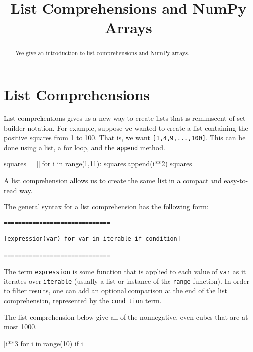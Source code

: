 \documentclass{ximera}
\title{List Comprehensions and NumPy Arrays}
\begin{document}
  
\begin{abstract}  
We give an introduction to list comprehensions and NumPy arrays.
\end{abstract}  
\maketitle

\section{List Comprehensions}

List comprehentions gives us a new way to create lists that is reminiscent of set builder notation. For example, suppose we wanted to create a list containing the positive squares from 1 to 100. That is, we want \verb|[1,4,9,...,100]|. This can be done using a list, a for loop, and the \verb|append| method.

\begin{sageCell}
squares = []
for i in range(1,11):
        squares.append(i**2)
squares
\end{sageCell}

A list comprehension allows us to create the same list in a compact and easy-to-read way.

\begin{sageCell}
\end{sageCell}

The general syntax for a list comprehension has the following form:

\begin{verbatim}
==============================

[expression(var) for var in iterable if condition]

==============================
\end{verbatim}

The term \verb|expression| is some function that is applied to each value of \verb|var| as it iterates over \verb|iterable| (usually a list or instance of the \verb|range| function). In order to filter results, one can add an optional comparison at the end of the list comprehension, represented by the \verb|condition| term.

The list comprehension below give all of the nonnegative, even cubes that are at most 1000.

\begin{sageCell}
[i**3 for i in range(10) if i%
\end{sageCell}
\end{document}

